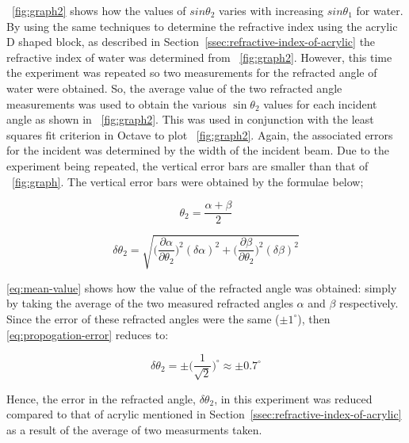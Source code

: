 \documentclass{article}
\newcommand{\figref}[2][\figurename~]{#1\ref{#2}}
\newcommand{\secref}[2][Section~]{#1\ref{#2}}
\begin{document}
\vspace{25mm}
\noindent
\figref{fig:graph2} shows how the values of $sin{\theta_2}$ varies with increasing $sin{\theta_1}$ for water. By using the same techniques to determine the refractive index using the acrylic D shaped block, as described in \secref{ssec:refractive-index-of-acrylic} the refractive index of water was determined from \figref{fig:graph2}. However, this time the experiment was repeated so two measurements for the refracted angle of water were obtained. So, the average value of the two refracted angle measurements was used to obtain the various $\sin{\theta_2}$ values for each incident angle as shown in \figref{fig:graph2}. This was used in conjunction with the least squares fit criterion in Octave to plot \figref{fig:graph2}. Again, the associated errors for the incident was determined by the width of the incident beam. Due to the experiment being repeated, the vertical error bars are smaller than that of \figref{fig:graph}. The vertical error bars were obtained by the formulae below;

\begin{equation}
\label{eq:mean-value}
\theta_2 = \frac{\alpha + \beta}{2}
\end{equation} 

\begin{equation}
\label{eq:propogation-error}
\delta\theta_2 = \sqrt{\bigg({\frac{\partial\alpha}{\partial\theta_2}}\bigg)^2(\delta\alpha)^2 + \bigg({\frac{\partial\beta}{\partial\theta_2}}\bigg)^2(\delta\beta)^2 }
\end{equation} 

\vspace{2mm}
\noindent
\eqref{eq:mean-value} shows how the value of the refracted angle was obtained: simply by taking the average of the two measured refracted angles $\alpha$ and $\beta$ respectively. Since the error of these refracted angles were the same ($\pm1^{\circ}$), then \eqref{eq:propogation-error} reduces to:

\begin{equation}
\label{eq:propogation-error2}
\delta\theta_2 = \pm\bigg(\frac{1}{\sqrt{2}}\bigg)^{\circ} \approx \pm0.7^{\circ}
\end{equation} 

\vspace{2mm}
\noindent
Hence, the error in the refracted angle, $\delta\theta_2$, in this experiment was reduced compared to that of acrylic mentioned in \secref{ssec:refractive-index-of-acrylic} as a result of the average of two measurments taken.
\end{document}
